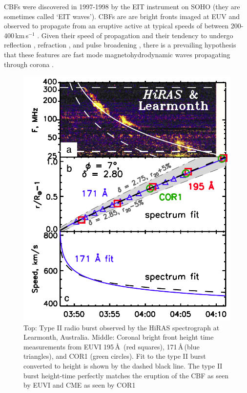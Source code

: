 CBFs were discovered in 1997-1998 \citep{moses1997, thompson1998} by the EIT instrument on SOHO (they are sometimes called \textquoteleft EIT waves'). CBFs are are bright fronts imaged at EUV and observed to propagate from an eruptive active at typical speeds of between 200-400\,km\,s$^{-1}$ \citep{thompson2009}. Given their speed of propagation and their tendency to undergo reflection \citep{gopal2009}, refraction \citep{wang2000}, and pulse broadening \citep{long2011}, there is a prevailing hypothesis that these features are fast mode magnetohydrodynamic waves propagating through corona \citep{veronig2010}.
\begin{figure}[!t]
\begin{center}
\includegraphics[trim=3cm 0cm 0cm 2cm, scale=0.3]{images/grechnev2011}
\caption[Comparison of EUV wave and type II height-time]{Top: Type II radio burst observed by the HiRAS spectrograph at Learmonth, Australia. Middle: Coronal bright front height time measurements from EUVI 195\,\AA\, (red squares), 171\,\AA\,(blue triangles), and COR1 (green circles). Fit to the type II burst converted to height is shown by the dashed black line. The type II burst height-time perfectly matches the eruption of the CBF as seen by EUVI and CME as seen by COR1 \citep{grechnev2011a}}
\label{fig:typeII_cbf}
\end{center}
\end{figure}

